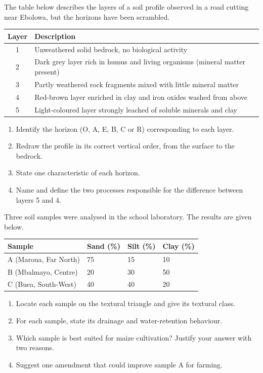 \documentclass[11pt]{article}
\begin{document}
\begin{exercice}
The table below describes the layers of a soil profile observed in a road cutting near Ebolowa, but the horizons have been scrambled.
\begin{center}
\begin{tabularx}{\linewidth}{|c|X|}
\hline
\rowcolor{popblueL} Layer & Description \\
\hline
1 & Unweathered solid bedrock, no biological activity \\
\hline
2 & Dark grey layer rich in humus and living organisms (mineral matter present) \\
\hline
3 & Partly weathered rock fragments mixed with little mineral matter \\
\hline
4 & Red-brown layer enriched in clay and iron oxides washed from above \\
\hline
5 & Light-coloured layer strongly leached of soluble minerals and clay \\
\hline
\end{tabularx}
\end{center}
\begin{enumerate}
\item Identify the horizon (O, A, E, B, C or R) corresponding to each layer.
\item Redraw the profile in its correct vertical order, from the surface to the bedrock.
\item State one characteristic of each horizon.
\item Name and define the two processes responsible for the difference between layers 5 and 4.
\end{enumerate}
\end{exercice}

\begin{exercice}
Three soil samples were analysed in the school laboratory. The results are given below.
\begin{center}
\begin{tabularx}{\linewidth}{|l|X|X|X|}
\hline
\rowcolor{popblueL} Sample & Sand (\%) & Silt (\%) & Clay (\%) \\
\hline
A (Maroua, Far North) & 75 & 15 & 10 \\
\hline
B (Mbalmayo, Centre) & 20 & 30 & 50 \\
\hline
C (Buea, South-West) & 40 & 40 & 20 \\
\hline
\end{tabularx}
\end{center}
\begin{enumerate}
\item Locate each sample on the textural triangle and give its textural class.
\item For each sample, state its drainage and water-retention behaviour.
\item Which sample is best suited for maize cultivation? Justify your answer with two reasons.
\item Suggest one amendment that could improve sample A for farming.
\end{enumerate}
\end{exercice}
\end{document}
